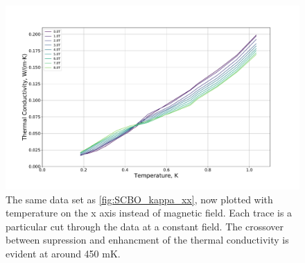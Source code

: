\documentclass{thesis-umich}
\begin{document}
\begin{figure}
	\caption[Temperature Dependence of SCBO Thermal Conductivity]{The same data set as \ref{fig:SCBO_kappa_xx}, now plotted with temperature on the x axis instead of magnetic field. Each trace is a particular cut through the data at a constant field. The crossover between supression and enhancment of the thermal conductivity is evident at around 450 mK.}
	\label{fig:SCBO_kappa_xx_vs_T}
	\includegraphics[width=\columnwidth]{figures/SCBO_kappa_vs_T.pdf}
\end{figure}
\end{document}
